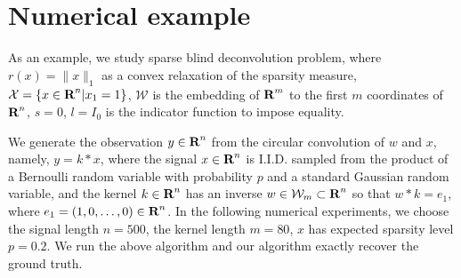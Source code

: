 \documentclass[12pt]{article}
\begin{document}
\section{Numerical example}
 As an example, we study sparse blind deconvolution problem, where  
 $r(x) = \|x\|_1$ as a convex relaxation of the sparsity measure, $\mathcal X = \{x\in {\mbox{\bf R}}^n| x_1=1\}$,
 $\mathcal W$ is the embedding of ${\mbox{\bf R}}^m$ to the first $m$ coordinates of ${\mbox{\bf R}}^n$, $s=0$, $l=I_{0}$ is the indicator function to impose equality.

We generate the observation $y\in {\mbox{\bf R}}^n$ from the circular convolution of $w$ and $x$, namely,  $y = k*x$, 
where the signal $x\in {\mbox{\bf R}}^n$ is I.I.D. sampled from the product of a Bernoulli random variable with probability $p$ and a standard Gaussian random variable,
 and the kernel $k\in {\mbox{\bf R}}^n$ has an inverse $w\in \mathcal W_m \subset {\mbox{\bf R}}^n$ so that $w*k = e_1$,
  where $e_1=(1,0,\ldots, 0)\in {\mbox{\bf R}}^n$. 
  In the following numerical experiments, we choose the signal length $n=500$, the kernel length $m= 80$, $x$ has expected sparsity level $p=0.2$. 
  We run the above algorithm and our algorithm exactly recover the ground truth.
\end{document}
